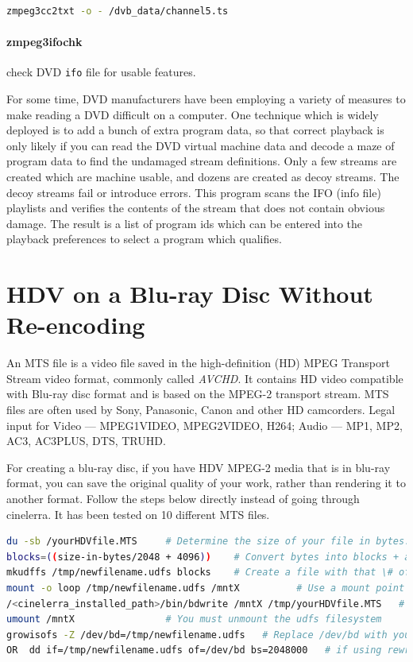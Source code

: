 \begin{lstlisting}[language=bash,numbers=none]
zmpeg3cc2txt -o - /dvb_data/channel5.ts
\end{lstlisting}

\paragraph{zmpeg3ifochk} check DVD \texttt{ifo} file for usable features.

For some time, DVD manufacturers have been employing  a variety of measures to make reading a DVD difficult on a computer.  One technique which is widely deployed is to add a bunch of extra program data, so that correct playback is only likely if you can read the DVD virtual machine data and decode a maze of program data to find the undamaged stream definitions.  Only a few streams are created which are machine usable, and dozens are created as decoy streams.  The decoy streams fail or introduce errors.  This program scans the IFO (info file) playlists and verifies the contents of the stream that does not contain obvious damage.  The result is a list of program ids which can be entered into the playback preferences to select a program which qualifies.

\section{HDV on a Blu-ray Disc Without Re-encoding}%
\label{sec:hdv_bd_without_reencoding}

An MTS file is a video file saved in the high-definition (HD) MPEG Transport Stream video format, commonly called \textit{AVCHD}.  It contains HD video compatible with Blu-ray disc format and is based on the MPEG-2 transport stream.   MTS files are often used by Sony, Panasonic, Canon and other HD camcorders.  Legal input for Video --- MPEG1VIDEO, MPEG2VIDEO, H264; Audio --- MP1, MP2, AC3, AC3PLUS, DTS, TRUHD. 

For creating a blu-ray disc, if you have HDV MPEG-2 media that is in blu-ray format, you can save the original quality of your work, rather than rendering it to another format.  Follow the steps below directly instead of going through cinelerra.  It has been tested on 10 different MTS files.

\begin{lstlisting}[language=bash,numbers=none]
du -sb /yourHDVfile.MTS		# Determine the size of your file in bytes.
blocks=((size-in-bytes/2048 + 4096))	# Convert bytes into blocks + a little more.	
mkudffs /tmp/newfilename.udfs blocks	# Create a file with that \# of blocks + some extra.
mount -o loop /tmp/newfilename.udfs /mntX          # Use a mount point like mntX that is not in use.
/<cinelerra_installed_path>/bin/bdwrite /mntX /tmp/yourHDVfile.MTS   # Substitute cinelerra path.
umount /mntX				# You must unmount the udfs filesystem
growisofs -Z /dev/bd=/tmp/newfilename.udfs   # Replace /dev/bd with your bluray hardware device.
OR  dd if=/tmp/newfilename.udfs of=/dev/bd bs=2048000   # if using rewritable blu-ray; replace bd.
\end{lstlisting}


